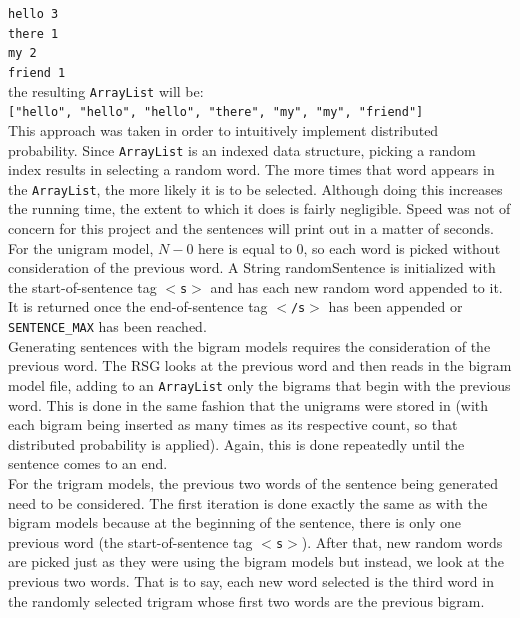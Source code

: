 \documentclass{article} %
\begin{document}
\texttt{hello 3\\
there 1\\
my 2\\
friend 1}\\

the resulting  \texttt{ArrayList} will be:\\

\texttt{["hello", "hello", "hello", "there", "my", "my", "friend"]}\\

This approach was taken in order to intuitively implement distributed probability. Since  \texttt{ArrayList} is an indexed data structure, picking a random index results in selecting a random word. The more times that word appears in the  \texttt{ArrayList}, the more likely it is to be selected. Although doing this increases the running time, the extent to which it does is fairly negligible. Speed was not of concern for this project and the sentences will print out in a matter of seconds.\\

For the unigram model, $N - 0$ here is equal to 0, so each word is picked without consideration of the previous word. A String randomSentence is initialized with the start-of-sentence tag  \texttt{$<$s$>$} and has each new random word appended to it. It is returned once the end-of-sentence tag  \texttt{$<$/s$>$} has been appended or  \texttt{SENTENCE\_MAX} has been reached.\\

Generating sentences with the bigram models requires the consideration of the previous word. The RSG looks at the previous word and then reads in the bigram model file, adding to an  \texttt{ArrayList} only the bigrams that begin with the previous word. This is done in the same fashion that the unigrams were stored in (with each bigram being inserted as many times as its respective count, so that distributed probability is applied). Again, this is done repeatedly until the sentence comes to an end.\\

For the trigram models, the previous two words of the sentence being generated need to be considered. The first iteration is done exactly the same as with the bigram models because at the beginning of the sentence, there is only one previous word (the start-of-sentence tag  \texttt{$<$s$>$}). After that, new random words are picked just as they were using the bigram models but instead, we look at the previous two words. That is to say, each new word selected is the third word in the randomly selected trigram whose first two words are the previous bigram.\\
\end{document}
